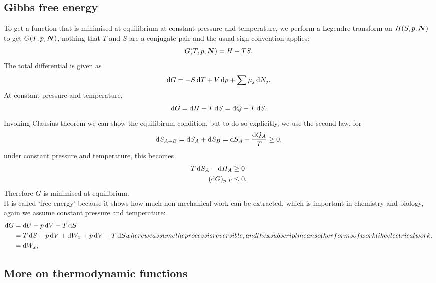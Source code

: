 \subsection{Gibbs free energy}
To get a function that is minimised at equilibrium at constant pressure and temperature, we perform a Legendre transform on $H(S,p,\boldsymbol{N})$ to get $G(T,p,\boldsymbol{N})$, nothing that $T$ and $S$ are a conjugate pair and the usual sign convention applies:
\begin{equation}
G(T,p,\boldsymbol{N})=H-TS.
\end{equation}
The total differential is given as 
\begin{equation}
\dif G=-S\dif T+V\dif p+\sum\mu_j\dif N_j.
\end{equation}
At constant pressure and temperature, 
\begin{equation}
\dif G=\dif H-T\dif S=\indiff Q-T\dif S.
\end{equation}
Invoking Clausius theorem we can show the equilibirum condition, but to do so explicitly, we use the second law, for 
\begin{equation}
\dif S_{A+B}=\dif S_A+\dif S_B=\dif S_A-\frac{\indiff Q_A}{T}\geq0, 
\end{equation}
under constant pressure and temperature, this becomes
\begin{equation}
\begin{aligned}
T\dif S_A-\dif H_A&\geq0\\
(\dif G)_{p, T}&\leq0.
\end{aligned}
\end{equation}
Therefore $G$ is minimised at equilibrium. \\
It is called `free energy' because it shows how much non-mechanical work can be extracted, which is important in chemistry and biology, again we assume constant pressure and temperature: 
\begin{subequations}
\begin{align}
\dif G&=\dif U+p\dif V-T\dif S\\
&=T\dif S-p\dif V+\indiff W_x+p\dif V-T\dif S\\
&=\indiff W_x, 
\end{align}
where we assume the process is reversible, and the $x$ subscript means other forms of work like electrical work.
\end{subequations}
\subsection{More on thermodynamic functions}
